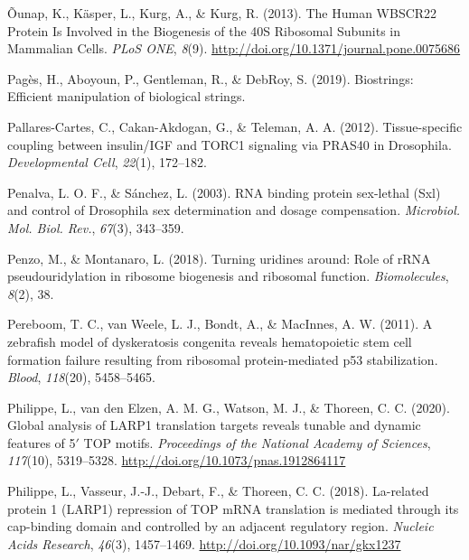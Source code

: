 \documentclass[12pt,oneside]{reedthesis}
\newlength{\cslhangindent}
\newenvironment{cslreferences}%
  {\setlength{\parindent}{0pt}%
  \everypar{\setlength{\hangindent}{\cslhangindent}}\ignorespaces}%
  {\par}
\begin{document}
\begin{cslreferences}
\leavevmode\hypertarget{ref-ounapHumanWBSCR22Protein2013}{}%
Õunap, K., Käsper, L., Kurg, A., \& Kurg, R. (2013). The Human WBSCR22 Protein Is Involved in the Biogenesis of the 40S Ribosomal Subunits in Mammalian Cells. \emph{PLoS ONE}, \emph{8}(9). \url{http://doi.org/10.1371/journal.pone.0075686}

\leavevmode\hypertarget{ref-pagesBiostringsEfficientManipulation2019}{}%
Pagès, H., Aboyoun, P., Gentleman, R., \& DebRoy, S. (2019). Biostrings: Efficient manipulation of biological strings.

\leavevmode\hypertarget{ref-Pallares-Cartes2012a}{}%
Pallares-Cartes, C., Cakan-Akdogan, G., \& Teleman, A. A. (2012). Tissue-specific coupling between insulin/IGF and TORC1 signaling via PRAS40 in Drosophila. \emph{Developmental Cell}, \emph{22}(1), 172--182.

\leavevmode\hypertarget{ref-Penalva2003}{}%
Penalva, L. O. F., \& Sánchez, L. (2003). RNA binding protein sex-lethal (Sxl) and control of Drosophila sex determination and dosage compensation. \emph{Microbiol. Mol. Biol. Rev.}, \emph{67}(3), 343--359.

\leavevmode\hypertarget{ref-Penzo2018}{}%
Penzo, M., \& Montanaro, L. (2018). Turning uridines around: Role of rRNA pseudouridylation in ribosome biogenesis and ribosomal function. \emph{Biomolecules}, \emph{8}(2), 38.

\leavevmode\hypertarget{ref-Pereboom2011a}{}%
Pereboom, T. C., van Weele, L. J., Bondt, A., \& MacInnes, A. W. (2011). A zebrafish model of dyskeratosis congenita reveals hematopoietic stem cell formation failure resulting from ribosomal protein-mediated p53 stabilization. \emph{Blood}, \emph{118}(20), 5458--5465.

\leavevmode\hypertarget{ref-philippeGlobalAnalysisLARP12020}{}%
Philippe, L., van den Elzen, A. M. G., Watson, M. J., \& Thoreen, C. C. (2020). Global analysis of LARP1 translation targets reveals tunable and dynamic features of 5\({'}\) TOP motifs. \emph{Proceedings of the National Academy of Sciences}, \emph{117}(10), 5319--5328. \url{http://doi.org/10.1073/pnas.1912864117}

\leavevmode\hypertarget{ref-philippeLarelatedProteinLARP12018}{}%
Philippe, L., Vasseur, J.-J., Debart, F., \& Thoreen, C. C. (2018). La-related protein 1 (LARP1) repression of TOP mRNA translation is mediated through its cap-binding domain and controlled by an adjacent regulatory region. \emph{Nucleic Acids Research}, \emph{46}(3), 1457--1469. \url{http://doi.org/10.1093/nar/gkx1237}


\end{cslreferences}
\end{document}
